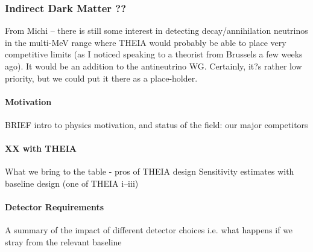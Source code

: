 \documentclass[11pt,prd,letterpaper,amsmath,amssymb,final,nofootinbib
,unsortedaddress,superscriptaddress
]{revtex4-1}
\begin{document}





\subsubsection{Indirect Dark Matter ?? }
From Michi -- there is still some interest in detecting decay/annihilation neutrinos in the multi-MeV range where THEIA would probably be able to place very competitive limits (as I noticed speaking to a theorist from Brussels a few weeks ago). It would be an addition to the antineutrino WG. Certainly, it?s rather low priority, but we could put it there as a place-holder.
\paragraph{Motivation}
BRIEF intro to physics motivation, and status of the field: our major competitors
\paragraph{XX with THEIA}
What we bring to the table - pros of THEIA design \newline
Sensitivity estimates with baseline design (one of THEIA i--iii)
\paragraph{Detector Requirements}
A summary of the impact of different detector choices i.e. what happens if we stray from the relevant baseline




%
%
%
%
%
%
\end{document}
